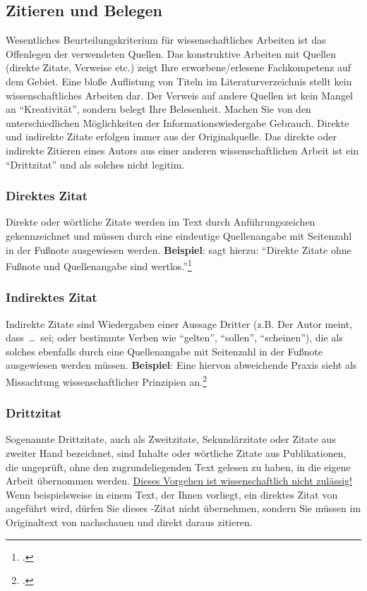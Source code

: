 \documentclass{japuzk}
\begin{document}
\subsection{Zitieren und Belegen}
Wesentliches Beurteilungskriterium für wissenschaftliches Arbeiten ist das Offenlegen der verwendeten Quellen. Das konstruktive Arbeiten mit Quellen (direkte Zitate, Verweise etc.) zeigt Ihre erworbene/erlesene Fachkompetenz auf dem Gebiet. Eine bloße Auflistung von Titeln im Literaturverzeichnis stellt kein wissenschaftliches Arbeiten dar. Der Verweis auf andere Quellen ist kein Mangel an \enquote{Kreativität}, sondern belegt Ihre Belesenheit. Machen Sie von den unterschiedlichen Möglichkeiten der Informationswiedergabe Gebrauch. Direkte und indirekte Zitate erfolgen immer aus der Originalquelle. Das direkte oder indirekte Zitieren eines Autors aus einer anderen wissenschaftlichen Arbeit ist ein \enquote{Drittzitat} und als solches nicht legitim.

\subsubsection{Direktes Zitat}
Direkte oder wörtliche Zitate werden im Text durch Anführungszeichen gekennzeichnet und müssen durch eine eindeutige Quellenangabe mit Seitenzahl in der Fußnote ausgewiesen werden.\newline
\textbf{Beispiel}: \citeauthor{muster:quellen} sagt hierzu: \enquote{Direkte Zitate ohne Fußnote und Quellenangabe sind wertlos.}\footcite[12]{muster:quellen}

\subsubsection{Indirektes Zitat}
Indirekte Zitate sind Wiedergaben einer Aussage Dritter (z.B. Der Autor meint, dass~\ldots~sei; oder bestimmte Verben wie \enquote{gelten}, \enquote{sollen}, \enquote{scheinen}), die als solches ebenfalls durch eine Quellenangabe mit Seitenzahl in der Fußnote ausgewiesen werden müssen.\newline
\textbf{Beispiel}: Eine hiervon abweichende Praxis sieht \citeauthor{doe:references} als Missachtung wissenschaftlicher Prinzipien an.\footcite[Vgl.][13\psq]{doe:references}

\subsubsection{Drittzitat}
Sogenannte Drittzitate, auch als Zweitzitate, Sekundärzitate oder Zitate aus zweiter Hand bezeichnet, sind Inhalte oder wörtliche Zitate aus Publikationen, die ungeprüft, ohne den zugrundeliegenden Text gelesen zu haben, in die eigene Arbeit übernommen werden. \underline{Dieses Vorgehen ist wissenschaftlich nicht zulässig!}\newline
Wenn beispielsweise in einem Text, der Ihnen vorliegt, ein direktes Zitat von  angeführt wird, dürfen Sie dieses -Zitat nicht übernehmen, sondern Sie müssen im Originaltext von  nachschauen und direkt daraus zitieren.
\end{document}
